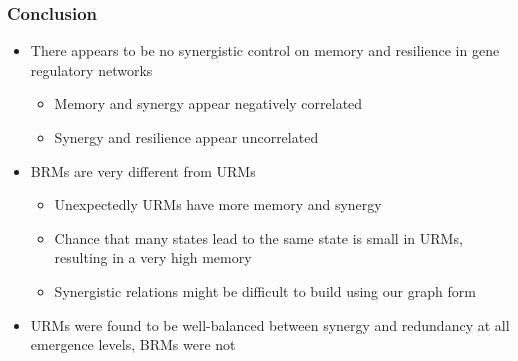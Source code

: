 \documentclass[hyperref={pdfpagelabels=false}]{beamer}
\begin{document}
\begin{frame}
\frametitle{Conclusion}
\begin{itemize}
\item There appears to be no synergistic control on memory and resilience in gene regulatory networks
\begin{itemize}
\item Memory and synergy appear negatively correlated
\item Synergy and resilience appear uncorrelated
\end{itemize}
\item BRMs are very different from URMs
\begin{itemize}
\item Unexpectedly URMs have more memory and synergy
\item Chance that many states lead to the same state is small in URMs, resulting in a very high memory
\item Synergistic relations might be difficult to build using our graph form
\end{itemize}
\item URMs were found to be well-balanced between synergy and redundancy at all emergence levels, BRMs were not
\end{itemize}
\end{frame}
\end{document}
